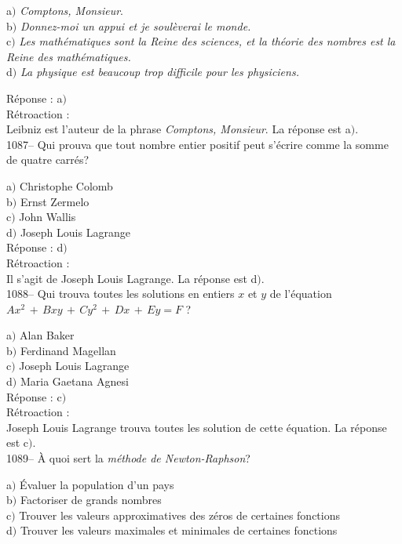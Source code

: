﻿\documentclass[letterpaper, 12pt]{article}
\begin{document}
a$)$ {\sl Comptons, Monsieur}. \\
b$)$ {\sl Donnez-moi un appui et je soul\`everai le monde.} \\
c$)$ {\sl Les math\'ematiques sont la Reine des sciences, et la th\'eorie
des nombres est la Reine des math\'ematiques.} \\
d$)$ {\sl La physique est beaucoup trop difficile pour les physiciens.}

R\'eponse : a$)$\\

R\'etroaction : \\
Leibniz est l'auteur de la phrase {\sl Comptons, Monsieur}.
La r\'eponse est a$)$.\\

1087-- Qui prouva que tout nombre entier positif peut s'\'ecrire
comme la somme de quatre carr\'es?

a$)$ Christophe Colomb \\
b$)$ Ernst Zermelo \\
c$)$ John Wallis \\
d$)$ Joseph Louis Lagrange\\

R\'eponse : d$)$\\

R\'etroaction : \\
Il s'agit de Joseph Louis Lagrange.
La r\'eponse est d$)$.\\

1088-- Qui trouva toutes les solutions en entiers $x$ et $y$ de
l'\'equation $Ax^2\,+\,Bxy\,+\,Cy^2\,+\,Dx\,+\,Ey=F$ ?

a$)$ Alan Baker \\
b$)$ Ferdinand Magellan \\
c$)$ Joseph Louis Lagrange \\
d$)$ Maria Gaetana Agnesi\\

R\'eponse : c$)$\\

R\'etroaction : \\
Joseph Louis Lagrange trouva toutes les solution de cette
\'equation.
La r\'eponse est c$)$.\\

1089-- \`A quoi sert la {\sl m\'ethode de Newton-Raphson}?

a$)$ \'Evaluer la population d'un pays \\
b$)$ Factoriser de grands nombres \\
c$)$ Trouver les valeurs approximatives des z\'eros de certaines fonctions
\\
d$)$ Trouver les valeurs maximales et minimales de certaines fonctions\\
\end{document}
